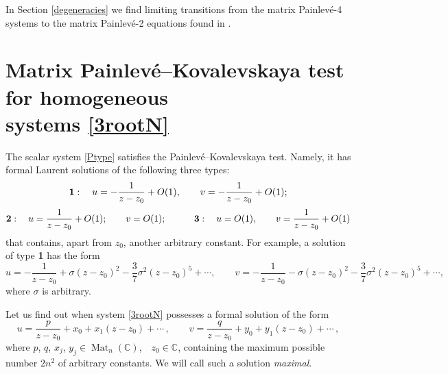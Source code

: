 \documentclass{article}
\theoremstyle{plain}
\DeclareMathOperator{\Mat}{Mat}
\newcommand{\PPainleve}{Painlev{\'e}}
\begin{document}
In Section \ref{degeneracies} we find limiting transitions from the matrix \PPainleve-4 systems  to the matrix \PPainleve-2 equations found in \cite{Adler_Sokolov_2020_1}.

\section{Matrix Painlev\'e--Kovalevskaya test for homogeneous \texorpdfstring{\\}{} systems \eqref{3rootN}}
\label{sec:Painlevetest}

The scalar  system \eqref{Ptype} satisfies the \PPainleve--Kovalevskaya test. Namely, it has formal Laurent solutions of the following three types:   
$$
{\bf 1}: \quad  u = -\frac{1}{z-z_0}+O(1), \qquad  v = -\frac{1}{z-z_0}+O(1);
$$
$$
{\bf 2}: \quad  u = \frac{1}{z-z_0}+O(1);  \qquad  v = O(1); \qquad \quad 
{\bf 3}: \quad  u =O(1), \qquad  v =  \frac{1}{z-z_0}+O(1)
$$
that contains, apart from $z_0$, another arbitrary constant. For example, a solution of type {\bf 1} has the form 
$$
u = -\frac{1}{z-z_0}+ \sigma (z-z_0)^2 - \frac{3}{7} \sigma^2  (z-z_0)^5 + \cdots,  
\qquad 
v = -\frac{1}{z-z_0} - \sigma (z-z_0)^2 - \frac{3}{7} \sigma^2  (z-z_0)^5 + \cdots,
$$
where $\sigma$ is arbitrary.

Let us find out when system \eqref{3rootN} possesses a formal solution of the form
\begin{equation}\label{y}
    u
    = \frac{p}{z-z_0}+x_0+x_1(z-z_0)+\cdots\,,
    \qquad 
    v
    =\frac{q}{z-z_0}+y_0+y_1(z-z_0)+\cdots\,,
\end{equation}
where $p$, $q$, $x_j$, $y_j \in \Mat_n (\mathbb{C})$, \,\, $z_0 \in \mathbb C$, containing the maximum possible number $2 n^2$ of arbitrary constants. We will call such a solution {\it maximal}. 
\end{document}

